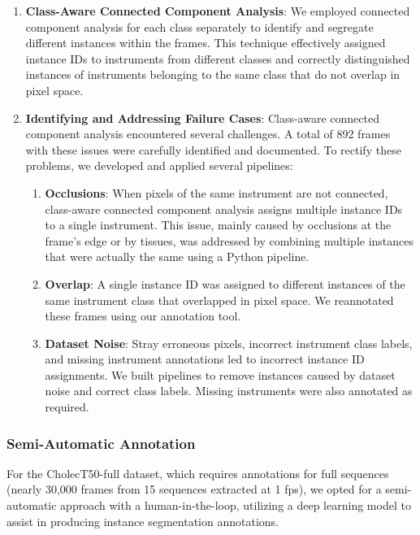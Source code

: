 \begin{enumerate}
    \item \textbf{Class-Aware Connected Component Analysis}: We employed connected component analysis for each class separately to identify and segregate different instances within the frames. This technique effectively assigned instance IDs to instruments from different classes and correctly distinguished instances of instruments belonging to the same class that do not overlap in pixel space.
    \item \textbf{Identifying and Addressing Failure Cases}: Class-aware connected component analysis encountered several challenges. A total of 892 frames with these issues were carefully identified and documented. To rectify these problems, we developed and applied several pipelines:
        \begin{enumerate}
            \item \textbf{Occlusions}: When pixels of the same instrument are not connected, class-aware connected component analysis assigns multiple instance IDs to a single instrument. This issue, mainly caused by occlusions at the frame's edge or by tissues, was addressed by combining multiple instances that were actually the same using a Python pipeline.
            \item \textbf{Overlap}: A single instance ID was assigned to different instances of the same instrument class that overlapped in pixel space. We reannotated these frames using our annotation tool.
            \item \textbf{Dataset Noise}: Stray erroneous pixels, incorrect instrument class labels, and missing instrument annotations led to incorrect instance ID assignments. We built pipelines to remove instances caused by dataset noise and correct class labels. Missing instruments were also annotated as required.
        \end{enumerate}
\end{enumerate}

\subsubsection{Semi-Automatic Annotation}
For the CholecT50-full dataset, which requires annotations for full sequences (nearly 30,000 frames from 15 sequences extracted at 1 fps), we opted for a semi-automatic approach with a human-in-the-loop, utilizing a deep learning model to assist in producing instance segmentation annotations.

